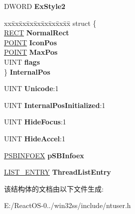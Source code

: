 \begin{DoxyCompactItemize}
\item 
\mbox{\label{struct___w_n_d_a2313767a2496284f8b8348463f74bd21}} 
D\+W\+O\+RD {\bfseries Ex\+Style2}
\item 
\mbox{\label{struct___w_n_d_af1a9b6fa8653b039a234a5d2b957dfc3}} 
\begin{tabbing}
xx\=xx\=xx\=xx\=xx\=xx\=xx\=xx\=xx\=\kill
struct \{\\
\>\hyperlink{structtag_r_e_c_t}{RECT} {\bfseries NormalRect}\\
\>\hyperlink{structtag_p_o_i_n_t}{POINT} {\bfseries IconPos}\\
\>\hyperlink{structtag_p_o_i_n_t}{POINT} {\bfseries MaxPos}\\
\>UINT {\bfseries flags}\\
\} {\bfseries InternalPos}\\

\end{tabbing}\item 
\mbox{\label{struct___w_n_d_a31c6dda12800e4f5c9b5bcb955e9e3bc}} 
U\+I\+NT {\bfseries Unicode}\+:1
\item 
\mbox{\label{struct___w_n_d_aef47aaf3450df177013e3eb2a2cd028c}} 
U\+I\+NT {\bfseries Internal\+Pos\+Initialized}\+:1
\item 
\mbox{\label{struct___w_n_d_a843cf2ba5824e48068fb6ac46b38a046}} 
U\+I\+NT {\bfseries Hide\+Focus}\+:1
\item 
\mbox{\label{struct___w_n_d_a8b99695d6f2236df80772291ac9a2295}} 
U\+I\+NT {\bfseries Hide\+Accel}\+:1
\item 
\mbox{\label{struct___w_n_d_a61582d5b2782d8a6f3726093fb428471}} 
\hyperlink{struct___s_b_i_n_f_o_e_x}{P\+S\+B\+I\+N\+F\+O\+EX} {\bfseries p\+S\+B\+Infoex}
\item 
\mbox{\label{struct___w_n_d_a10f8120c4369d301cb449548c67cd7b6}} 
\hyperlink{struct___l_i_s_t___e_n_t_r_y}{L\+I\+S\+T\+\_\+\+E\+N\+T\+RY} {\bfseries Thread\+List\+Entry}
\end{DoxyCompactItemize}


该结构体的文档由以下文件生成\+:\begin{DoxyCompactItemize}
\item 
E\+:/\+React\+O\+S-\/0../win32ss/include/ntuser.\+h\end{DoxyCompactItemize}
